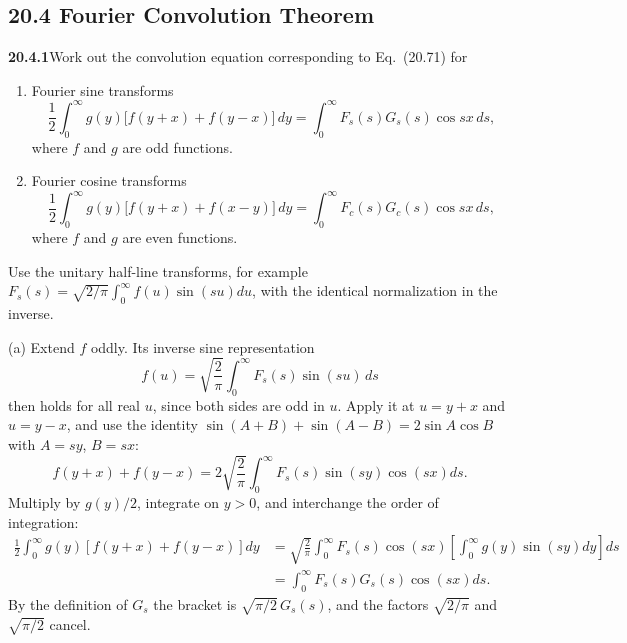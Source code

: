 \subsection*{20.4 Fourier Convolution Theorem}

\par\bigskip
\noindent\textbf{20.4.1}\quad Work out the convolution equation
corresponding to Eq.~(20.71) for
\begin{enumerate}
\item[(a)] Fourier sine transforms
\[
\frac{1}{2}\int_{0}^{\infty}g(y)\big[f(y+x)+f(y-x)\big]\,dy
=\int_{0}^{\infty}F_{s}(s)G_{s}(s)\cos sx\,ds,
\]
where $f$ and $g$ are odd functions.
\item[(b)] Fourier cosine transforms
\[
\frac{1}{2}\int_{0}^{\infty}g(y)\big[f(y+x)+f(x-y)\big]\,dy
=\int_{0}^{\infty}F_{c}(s)G_{c}(s)\cos sx\,ds,
\]
where $f$ and $g$ are even functions.
\end{enumerate}
\solution
Use the unitary half-line transforms, for example
$F_s(s)=\sqrt{2/\pi}\int_0^\infty f(u)\sin(su)du$,
with the identical normalization in the inverse.

(a) Extend $f$ oddly. Its inverse sine representation
\[
f(u)=\sqrt{\frac2\pi}\int_0^\infty F_s(s)\sin(su)\,ds
\]
then holds for all real $u$, since both sides are odd in $u$.
Apply it at $u=y+x$ and $u=y-x$, and use the identity
$\sin(A+B)+\sin(A-B)=2\sin A\cos B$ with $A=sy$, $B=sx$:
\[
f(y+x)+f(y-x)=2\sqrt{\frac2\pi}\int_0^\infty
F_s(s)\sin(sy)\cos(sx)ds.
\]
Multiply by $g(y)/2$, integrate on $y>0$, and interchange the
order of integration:
\begin{align*}
\frac12\int_0^\infty g(y)[f(y+x)+f(y-x)]dy
&=\sqrt{\frac2\pi}\int_0^\infty F_s(s)\cos(sx)
\left[\int_0^\infty g(y)\sin(sy)dy\right]ds\\
&=\int_0^\infty F_s(s)G_s(s)\cos(sx)ds.
\end{align*}
By the definition of $G_s$ the bracket is
$\sqrt{\pi/2}\,G_s(s)$, and the factors $\sqrt{2/\pi}$ and
$\sqrt{\pi/2}$ cancel.

